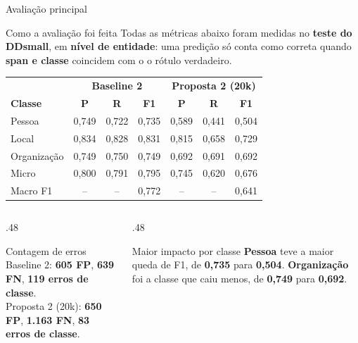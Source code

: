 \documentclass[aspectratio=169, 9pt]{beamer}
\begin{document}
\begin{frame}{Avaliação principal}
  \begin{block}{Como a avaliação foi feita}
    Todas as métricas abaixo foram medidas no \textbf{teste do DDsmall}, em \textbf{nível de entidade}: uma predição só conta como correta quando \textbf{span e classe} coincidem com o o rótulo verdadeiro.
  \end{block}

  \vspace{4pt}
  \centering
  \scriptsize
  \begin{tabular}{lccc|ccc}
    \toprule
    & \multicolumn{3}{c|}{\textbf{Baseline 2}} & \multicolumn{3}{c}{\textbf{Proposta 2 (20k)}} \\
    \textbf{Classe} & \textbf{P} & \textbf{R} & \textbf{F1} & \textbf{P} & \textbf{R} & \textbf{F1} \\
    \midrule
    Pessoa & 0,749 & 0,722 & 0,735 & 0,589 & 0,441 & 0,504 \\
    Local & 0,834 & 0,828 & 0,831 & 0,815 & 0,658 & 0,729 \\
    Organização & 0,749 & 0,750 & 0,749 & 0,692 & 0,691 & 0,692 \\
    \midrule
    Micro & 0,800 & 0,791 & 0,795 & 0,745 & 0,620 & 0,676 \\
    Macro F1 & -- & -- & 0,772 & -- & -- & 0,641 \\
    \bottomrule
  \end{tabular}

  \vspace{6pt}
  \begin{columns}[T]
    \begin{column}{.48\textwidth}
      \begin{exampleblock}{Contagem de erros}
        \small
        Baseline 2: \textbf{605 FP}, \textbf{639 FN}, \textbf{119 erros de classe}.\\[2pt]
        Proposta 2 (20k): \textbf{650 FP}, \textbf{1.163 FN}, \textbf{83 erros de classe}.
      \end{exampleblock}
    \end{column}
    \begin{column}{.48\textwidth}
      \begin{block}{Maior impacto por classe}
        \small
        \textbf{Pessoa} teve a maior queda de F1, de \textbf{0,735} para \textbf{0,504}. \textbf{Organização} foi a classe que caiu menos, de \textbf{0,749} para \textbf{0,692}.
      \end{block}
    \end{column}
  \end{columns}
\end{frame}
\end{document}
